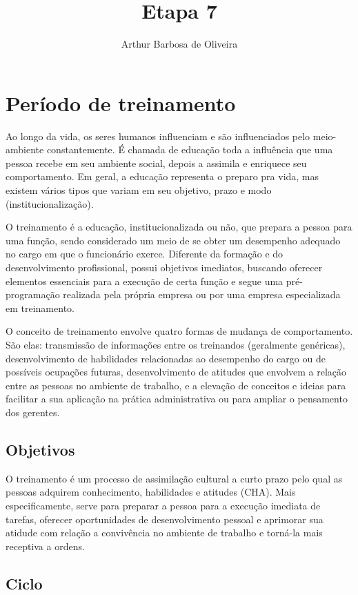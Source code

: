 \documentclass[12pt]{article}
\author{Arthur Barbosa de Oliveira}
\title{Etapa 7}
\begin{document}
\maketitle

\section{Período de treinamento}

Ao longo da vida, os seres humanos influenciam e são influenciados pelo meio-ambiente constantemente. É chamada de educação toda a influência que uma pessoa recebe em seu ambiente social, depois a assimila e enriquece seu comportamento. Em geral, a educação representa o preparo pra vida, mas existem vários tipos que variam em seu objetivo, prazo e modo (institucionalização). 

O treinamento é a educação, institucionalizada ou não, que prepara a pessoa para uma função, sendo considerado um meio de se obter um desempenho adequado no cargo em que o funcionário exerce. Diferente da formação e do desenvolvimento profissional, possui objetivos imediatos, buscando oferecer elementos essenciais para a execução de certa função e segue uma pré-programação realizada pela própria empresa ou por uma empresa especializada em treinamento.

O conceito de treinamento envolve quatro formas de mudança de comportamento. São elas: transmissão de informações entre os treinandos (geralmente genéricas), desenvolvimento de habilidades relacionadas ao desempenho do cargo ou de possíveis ocupações futuras, desenvolvimento de atitudes que envolvem a relação entre as pessoas no ambiente de trabalho, e a elevação de conceitos e ideias para facilitar a sua aplicação na prática administrativa ou para ampliar o pensamento dos gerentes.

\subsection{Objetivos}

O treinamento é um processo de assimilação cultural a curto prazo pelo qual as pessoas adquirem conhecimento, habilidades e atitudes (CHA). Mais especificamente, serve para preparar a pessoa para a execução imediata de tarefas, oferecer oportunidades de desenvolvimento pessoal e aprimorar sua atidude com relação a convivência no ambiente de trabalho e torná-la mais receptiva a ordens.

\subsection{Ciclo}
\end{document}
